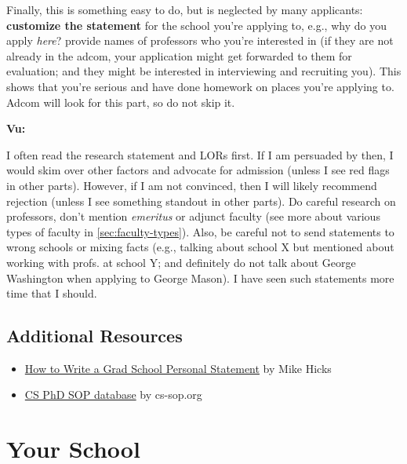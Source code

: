 \documentclass[oneside,11pt]{memoir}
\newenvironment{commentbox}[1][]{
  \small
  \begin{mybox}
    {\small \textbf{#1}}
  }{
  \end{mybox}
}
\begin{document}
Finally, this is something easy to do, but is neglected by many
applicants: \textbf{customize the statement} for the school you're applying to,
e.g., why do you apply \emph{here}? provide names of professors who you're interested in (if they are not already in the adcom, your application might get forwarded to them for evaluation; and they might be interested in interviewing and recruiting you).
This shows that you're serious and have done homework on places you're applying to.
Adcom will look for this part, so do not skip it.



\begin{commentbox}[Vu:]
  I often read the research statement and LORs first. If I am
  persuaded by then, I would skim over other factors and advocate for
  admission (unless I see red flags in other parts). However, if I am not
  convinced, then I will likely recommend rejection (unless I see
  something standout in other parts).
  \tcblower
  Do careful research on professors, don't mention \emph{emeritus} or  adjunct faculty (see more about various types of faculty in \autoref{sec:faculty-types}).
  Also, be careful not to send statements to wrong schools or mixing
  facts (e.g., talking about school X but mentioned about working with
  profs. at school Y; and definitely do not talk about George Washington when applying to George Mason). I have seen such statements more time that I
  should.
\end{commentbox}

\subsection*{Additional Resources}
\begin{itemize}
  \item \href{http://www.pl-enthusiast.net/2022/10/03/how-to-write-a-grad-school-personal-statement/}{How to Write a Grad School Personal Statement} by Mike Hicks
  \item     \href{https://cs-sop.notion.site/cs-sop/CS-PhD-Statements-of-Purpose-df39955313834889b7ac5411c37b958d?p=f5d5980a71524ebaa4e6ae57266b847c&pm=s}{CS PhD SOP database} by cs-sop.org
\end{itemize}

\section{Your School}\label{sec:your-school}
\end{document}
